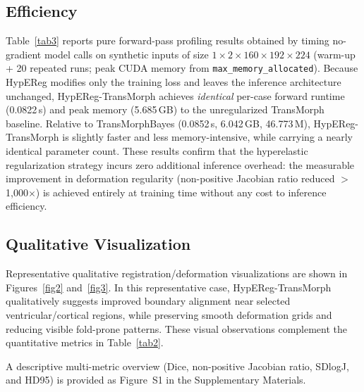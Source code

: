 \documentclass[jimaging,article,submit,pdftex,moreauthors]{Definitions/mdpi}
\begin{document}
\subsection{Efficiency}
Table~\ref{tab3} reports pure forward-pass profiling results obtained by timing no-gradient model calls on synthetic inputs of size $1\times2\times160\times192\times224$ (warm-up + 20 repeated runs; peak CUDA memory from \texttt{max\_memory\_allocated}). Because HypEReg modifies only the training loss and leaves the inference architecture unchanged, HypEReg-TransMorph achieves \emph{identical} per-case forward runtime (0.0822\,s) and peak memory (5.685\,GB) to the unregularized TransMorph baseline. Relative to TransMorphBayes (0.0852\,s, 6.042\,GB, 46.773\,M), HypEReg-TransMorph is slightly faster and less memory-intensive, while carrying a nearly identical parameter count. These results confirm that the hyperelastic regularization strategy incurs zero additional inference overhead: the measurable improvement in deformation regularity (non-positive Jacobian ratio reduced $>$1,000$\times$) is achieved entirely at training time without any cost to inference efficiency.

\subsection{Qualitative Visualization}
Representative qualitative registration/deformation visualizations are shown in Figures~\ref{fig2} and~\ref{fig3}. In this representative case, HypEReg-TransMorph qualitatively suggests improved boundary alignment near selected ventricular/cortical regions, while preserving smooth deformation grids and reducing visible fold-prone patterns. These visual observations complement the quantitative metrics in Table~\ref{tab2}.

\noindent A descriptive multi-metric overview (Dice, non-positive Jacobian ratio, SDlogJ, and HD95) is provided as Figure~S1 in the Supplementary Materials.
\end{document}
